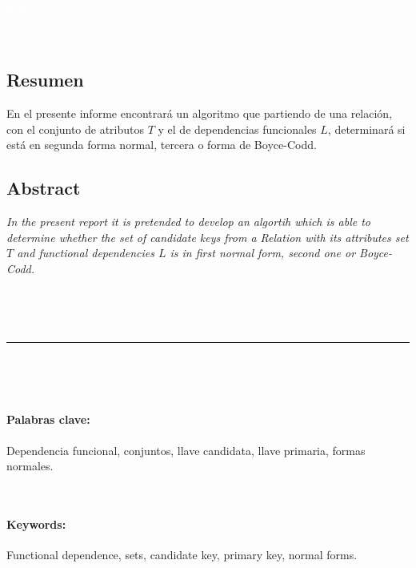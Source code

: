 \documentclass[a4paper,12pt]{article}
\newcommand{\vacio}{\textcolor{white}{holacaracola}}
\begin{document}

{%

\newpage

\renewcommand{\headrulewidth}{0.5pt}
\fancyhead[L]{\vacio}

\renewcommand{\footrulewidth}{0.5pt}
\fancyfoot[C]{}



\

\vacio

\


\subsection*{Resumen}
En el presente informe encontrará un algoritmo que partiendo de una relación, con el conjunto de atributos $T$ y el de dependencias funcionales $L$, determinará si está en segunda forma normal, tercera o forma de Boyce-Codd.


\subsection*{Abstract}
\textsl{
In the present report it is pretended to develop an algortih which is able to determine whether the set of candidate keys from a Relation with its attributes set $T$ and functional dependencies $L$ is in first normal form, second one or Boyce-Codd.}

\ %

\

\hrule

\

\


\paragraph{Palabras clave:} Dependencia funcional, conjuntos, llave candidata, llave primaria, formas normales.

\


\paragraph{Keywords:} Functional dependence, sets, candidate key, primary key, normal forms.







}
\end{document}
